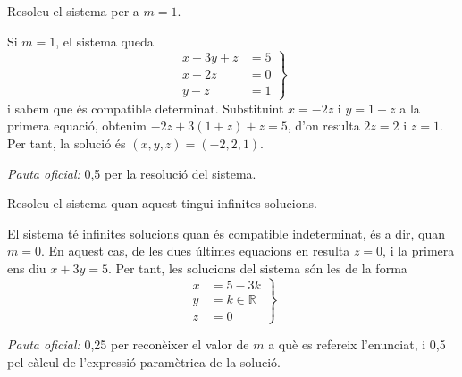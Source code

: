 \begin{apartats}
Resoleu el sistema per a $m=1$.

\begin{solucio}
Si $m=1$, el sistema queda
\[
\left.\begin{aligned}x+3y+z&=5\\x+2z&=0\\y-z&=1\end{aligned}\right\}
\]
i sabem que és compatible determinat. Substituint $x=-2z$ i $y=1+z$ a la primera equació, obtenim
$-2z+3(1+z)+z=5$, d'on resulta $2z=2$ i $z=1$. Per tant, la solució és $(x,y,z)=(-2,2,1)$.

\textit{Pauta oficial:} 0,5 per la resolució del sistema.
\end{solucio}

Resoleu el sistema quan aquest tingui infinites solucions.

\begin{solucio}
El sistema té infinites solucions quan és compatible indeterminat, és a dir, quan $m=0$. En aquest cas, de les
dues últimes equacions en resulta $z=0$, i la primera ens diu $x+3y=5$. Per tant, les solucions del sistema
són les de la forma
\[
\left.\begin{aligned}x&=5-3k\\y&=k\in\mathbb{R}\\z&=0\end{aligned}\right\}
\]

\textit{Pauta oficial:} 0,25 per reconèixer el valor de $m$ a què es refereix l'enunciat, i 0,5 pel càlcul de
l'expressió paramètrica de la solució.
\end{solucio}

\end{apartats}
